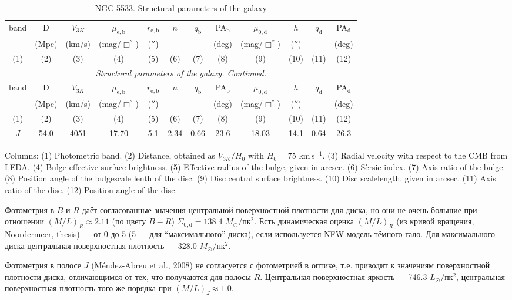 \documentclass[english,10pt]{article}
\def\mm{\mathrm}
\begin{document}
\begin{longtable}[c]{cccccccccccc}
\caption{NGC 5533. Structural parameters of the galaxy} \\ 
\hline 
band & D & $V_{3K}$ & 
$\mu_\mm{e,b}$ & $r_\mm{e,b}$ & $n$ & $q_\mm{b}$ & PA$_\mm{b}$ & 
$\mu_\mm{0,d}$ & $h$ & $q_\mm{d}$ & PA$_\mm{d}$ \\ 
& (Mpc) & (km/s) & 
(mag/$\Box^{''}$) & ($''$) & & & (deg) & 
(mag/$\Box^{''}$) & ($''$) & & (deg) \\
(1)&(2)&(3)&(4)&(5)&(6)&(7)&(8)&(9)&(10)&(11)&(12) \\ 
\hline
\endfirsthead 
\hline
\multicolumn{12}{c}{\small\slshape Structural parameters of the galaxy. 
Continued. } \\ \hline
band & D & $V_{3K}$ & 
$\mu_\mm{e,b}$ & $r_\mm{e,b}$ & $n$ & $q_\mm{b}$ & PA$_\mm{b}$ & 
$\mu_\mm{0,d}$ & $h$ & $q_\mm{d}$ & PA$_\mm{d}$ \\ 
& (Mpc) & (km/s) & 
(mag/$\Box^{''}$) & ($''$) & & & (deg) & 
(mag/$\Box^{''}$) & ($''$) & & (deg) \\
(1)&(2)&(3)&(4)&(5)&(6)&(7)&(8)&(9)&(10)&(11)&(12) \\
\hline
\endhead 
\hline
$J$ & 54.0 & 4051 &
17.70 & 5.1 & 2.34 & 0.66 & 23.6 & 
18.03 & 14.1 & 0.64 & 26.3 \tabularnewline
\hline
\end{longtable}

Columns:
(1) Photometric band.
(2) Distance, obtained as $V_{3K}/H_0$ with $H_0=$75 km\,s$^{-1}$.
(3) Radial velocity with respect to the CMB from LEDA.
(4) Bulge effective surface brightness. 
(5) Effective radius of the bulge, given in arcsec.
(6) S\`ersic index. 
(7) Axis ratio of the bulge.
(8) Position angle of the bulgescale lenth of the disc.
(9) Disc central surface brightness. 
(10) Disc scalelength, given in arcsec.
(11) Axis ratio of the disc.
(12) Position angle of the disc. 

\bigskip
\noindent
Фотометрия в $B$ и $R$ даёт согласованные значения центральной 
поверхностной плотности для диска, но они не очень большие 
при отношении $(M/L)_R \approx 2.11$ (по цвету $B-R$) 
$\Sigma_{0,\mathrm{d}} = 138.4 \, \, M_\odot/$пк$^2$. 
Есть динамическая оценка $(M/L)_R$ (из кривой вращения, 
Noordermeer, thesis) --- от 0 до 5 
(5 --- для ``максимального'' диска), если используется 
NFW модель тёмного гало. Для максимального диска 
центральная поверхностная плотность --- 328.0 $M_\odot/$пк$^2$. 

\bigskip
\noindent
Фотометрия в полосе $J$ (M\'{e}ndez-Abreu et al., 2008) 
не согласуется с фотометрией в оптике, т.е. приводит к 
значениям поверхностной плотности диска, отличающимся от тех, что 
получаются для полосы $R$. Центральная поверхностная яркость --- 
746.3 $L_\odot/$пк$^2$, центральная поверхностная плотность 
того же порядка при $(M/L)_J \approx 1.0$.
\end{document}
